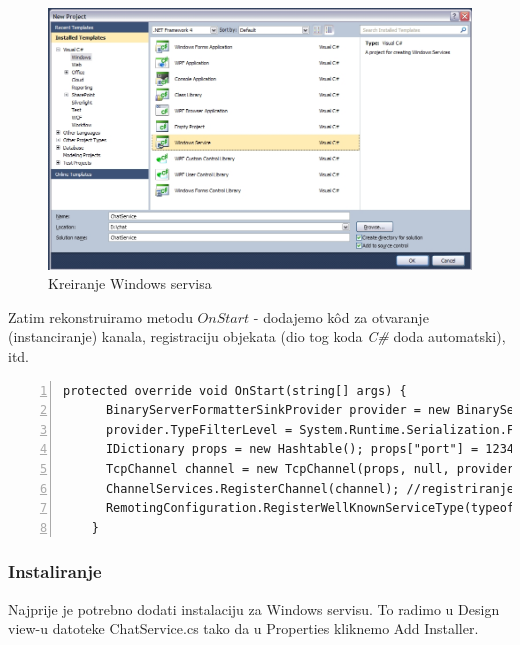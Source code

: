 \documentclass[10pt,a4paper,onecolumn,titlepage]{article}
\begin{document}
\begin{figure}[!ht]
\begin{minipage}{\textwidth}
\centering
\includegraphics[width=\textwidth]{images/create_service.jpg}
\caption{Kreiranje Windows servisa}
\end{minipage}
\end{figure}

Zatim rekonstruiramo metodu $OnStart$ - dodajemo k\^{o}d za otvaranje (instanciranje)
kanala, registraciju objekata (dio tog koda \textit{C\#} doda automatski), itd.
\lstset{style=sharpc}
\begin{lstlisting}[numbers=left, breaklines=true]
protected override void OnStart(string[] args) {
      BinaryServerFormatterSinkProvider provider = new BinaryServerFormatterSinkProvider(); 
      provider.TypeFilterLevel = System.Runtime.Serialization.Formatters.TypeFilterLevel.Full; 
      IDictionary props = new Hashtable(); props["port"] = 12345; //server ce slushati a portu 12345
      TcpChannel channel = new TcpChannel(props, null, provider); 
      ChannelServices.RegisterChannel(channel); //registriranje na kanal
      RemotingConfiguration.RegisterWellKnownServiceType(typeof(ChatServer), "Chat.ChatServer", WellKnownObjectMode.Singleton);//ime servera je "Chat.Chatserver"
    }

\end{lstlisting}
\subsubsection{Instaliranje}
Najprije je potrebno dodati instalaciju za Windows servisu. To radimo u Design view-u datoteke ChatService.cs tako da u Properties kliknemo Add Installer.
\end{document}
